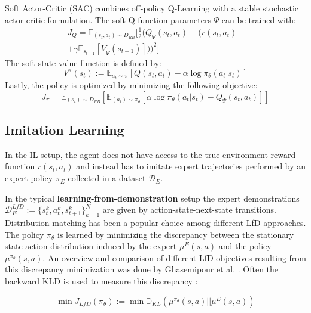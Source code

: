 \documentclass{article}
\begin{document}
Soft Actor-Critic (SAC) \cite{haarnoja2018SAC,haarnoja2018sacapps} combines off-policy Q-Learning with a stable stochastic actor-critic formulation. 
The soft Q-function parameters $\Psi$ can be trained with:
\begin{equation}\label{qloss}
\begin{aligned}
J_Q  = \mathbb{E}_{(s_t,a_t) \sim D_{RB}}[
\frac{1}{2}(Q_{\Psi}(s_t,a_t) -  (r(s_t,a_t) & \\ + \gamma \mathbb{E}_{s_{t+1}}[V_{\hat{\Psi}}(s_{t+1})]))^2]
\end{aligned}
\end{equation}
The soft state value function is defined by:
\begin{equation}
V^{\pi}(s_t):=\mathbb{E}_{a_t \sim \pi}[Q(s_t,a_t) - \alpha \log \pi_{\theta}(a_t|s_t)]
\end{equation}
 Lastly, the policy is optimized by minimizing the following objective:
\begin{equation}\label{piloss}
J_{\pi} = \mathbb{E}_{(s_t) \sim D_{RB}}[
\mathbb{E}_{(a_t) \sim \pi_{\theta}}[\alpha \log \pi_{\theta}(a_t|s_t) - Q_{\Psi}(s_t,a_t)]
]
\end{equation}

\subsection{Imitation Learning}

In the IL setup, the agent does not have access to the true environment reward function $r(s_t, a_t)$ and instead has to imitate expert trajectories performed by an expert policy $\pi_{E}$ collected in a dataset $\mathcal{D}_E$. 

In the typical \textbf{learning-from-demonstration} setup the expert demonstrations $\mathcal{D}^{LfD}_E:=\{s^k_t,a^k_t, s^k_{t+1}\}^N_{k=1}$ are given by action-state-next-state transitions. Distribution matching has been a popular choice among different LfD approaches. The policy $\pi_{\theta}$ is learned by minimizing the discrepancy between the stationary state-action distribution induced by the expert $\mu^{E}(s,a)$ and the policy $\mu^{\pi_{\theta}}(s,a)$. An overview and comparison of different LfD objectives resulting from this discrepancy minimization was done by Ghasemipour et al. . Often the backward KLD is used to measure this discrepancy \cite{fu2017learning}: 

\begin{equation}
\min J_{LfD}(\pi_{\theta}) := \min \mathbb{D}_{KL}(\mu^{\pi_{\theta}}(s,a)||\mu^{E}(s,a))    
\end{equation}
\end{document}
